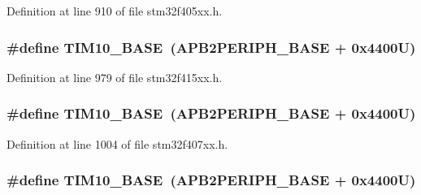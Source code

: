 Definition at line 910 of file stm32f405xx.\+h.

\subsubsection[{\texorpdfstring{T\+I\+M10\+\_\+\+B\+A\+SE}{TIM10_BASE}}]{\setlength{\rightskip}{0pt plus 5cm}\#define T\+I\+M10\+\_\+\+B\+A\+SE~({\bf A\+P\+B2\+P\+E\+R\+I\+P\+H\+\_\+\+B\+A\+SE} + 0x4400\+U)}\hypertarget{group___peripheral__registers__structures_ga3eff32f3801db31fb4b61d5618cad54a}{}\label{group___peripheral__registers__structures_ga3eff32f3801db31fb4b61d5618cad54a}


Definition at line 979 of file stm32f415xx.\+h.

\subsubsection[{\texorpdfstring{T\+I\+M10\+\_\+\+B\+A\+SE}{TIM10_BASE}}]{\setlength{\rightskip}{0pt plus 5cm}\#define T\+I\+M10\+\_\+\+B\+A\+SE~({\bf A\+P\+B2\+P\+E\+R\+I\+P\+H\+\_\+\+B\+A\+SE} + 0x4400\+U)}\hypertarget{group___peripheral__registers__structures_ga3eff32f3801db31fb4b61d5618cad54a}{}\label{group___peripheral__registers__structures_ga3eff32f3801db31fb4b61d5618cad54a}


Definition at line 1004 of file stm32f407xx.\+h.

\subsubsection[{\texorpdfstring{T\+I\+M10\+\_\+\+B\+A\+SE}{TIM10_BASE}}]{\setlength{\rightskip}{0pt plus 5cm}\#define T\+I\+M10\+\_\+\+B\+A\+SE~({\bf A\+P\+B2\+P\+E\+R\+I\+P\+H\+\_\+\+B\+A\+SE} + 0x4400\+U)}\hypertarget{group___peripheral__registers__structures_ga3eff32f3801db31fb4b61d5618cad54a}{}\label{group___peripheral__registers__structures_ga3eff32f3801db31fb4b61d5618cad54a}


